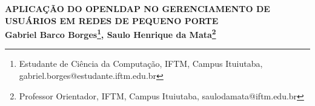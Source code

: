 \begin{center}
\textbf{APLICAÇÃO DO OPENLDAP NO GERENCIAMENTO DE USUÁRIOS EM REDES DE PEQUENO PORTE\\
Gabriel Barco Borges\footnote[1]{Estudante de Ciência da Computação, IFTM, Campus Ituiutaba, gabriel.borges@estudante.iftm.edu.br}, Saulo Henrique da Mata\footnote[2]{Professor Orientador, IFTM, Campus Ituiutaba, saulodamata@iftm.edu.br}}
\end{center}